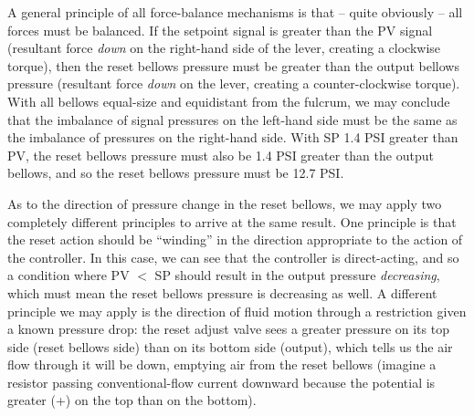 A general principle of all force-balance mechanisms is that -- quite obviously -- all forces must be balanced.  If the setpoint signal is greater than the PV signal (resultant force {\it down} on the right-hand side of the lever, creating a clockwise torque), then the reset bellows pressure must be greater than the output bellows pressure (resultant force {\it down} on the lever, creating a counter-clockwise torque).  With all bellows equal-size and equidistant from the fulcrum, we may conclude that the imbalance of signal pressures on the left-hand side must be the same as the imbalance of pressures on the right-hand side.  With SP 1.4 PSI greater than PV, the reset bellows pressure must also be 1.4 PSI greater than the output bellows, and so the reset bellows pressure must be 12.7 PSI.

As to the direction of pressure change in the reset bellows, we may apply two completely different principles to arrive at the same result.  One principle is that the reset action should be ``winding'' in the direction appropriate to the action of the controller.  In this case, we can see that the controller is direct-acting, and so a condition where PV $<$ SP should result in the output pressure {\it decreasing}, which must mean the reset bellows pressure is decreasing as well.  A different principle we may apply is the direction of fluid motion through a restriction given a known pressure drop: the reset adjust valve sees a greater pressure on its top side (reset bellows side) than on its bottom side (output), which tells us the air flow through it will be down, emptying air from the reset bellows (imagine a resistor passing conventional-flow current downward because the potential is greater (+) on the top than on the bottom).




